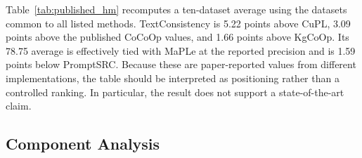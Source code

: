 \documentclass[preprint,12pt]{elsarticle}
\begin{document}
\begin{table}[t]
\centering
\caption{Comparison with published base-to-novel HM results on the ten datasets common to all methods. Published values are marked with $\dagger$ and are not local reproductions.}
\label{tab:published_hm}
\scriptsize
\setlength{\tabcolsep}{3.2pt}
\end{table}

Table~\ref{tab:published_hm} recomputes a ten-dataset average using the datasets common to all listed methods. TextConsistency is 5.22 points above CuPL, 3.09 points above the published CoCoOp values, and 1.66 points above KgCoOp. Its 78.75 average is effectively tied with MaPLe at the reported precision and is 1.59 points below PromptSRC. Because these are paper-reported values from different implementations, the table should be interpreted as positioning rather than a controlled ranking. In particular, the result does not support a state-of-the-art claim.

\subsection{Component Analysis}
\label{sec:component}
\end{document}
